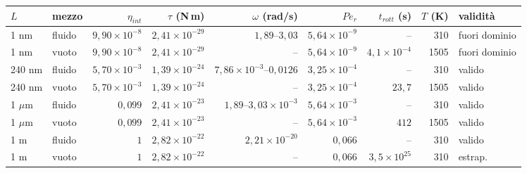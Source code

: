 \begin{tabular}{llrrrrrrl}
\hline
$L$ & mezzo & $\eta_{int}$ & $\tau$ (N\,m) & $\omega$ (rad/s) & $Pe_r$ & $t_{rott}$ (s) & $T$ (K) & validit\`a \\
\hline
1 nm & fluido & $9{,}90\times10^{-8}$ & $2{,}41\times10^{-29}$ & $1{,}89$--$3{,}03$ & $5{,}64\times10^{-9}$ & -- & 310 & fuori dominio \\
1 nm & vuoto & $9{,}90\times10^{-8}$ & $2{,}41\times10^{-29}$ & -- & $5{,}64\times10^{-9}$ & $4{,}1\times10^{-4}$ & 1505 & fuori dominio \\
240 nm & fluido & $5{,}70\times10^{-3}$ & $1{,}39\times10^{-24}$ & $7{,}86\times10^{-3}$--$0{,}0126$ & $3{,}25\times10^{-4}$ & -- & 310 & valido \\
240 nm & vuoto & $5{,}70\times10^{-3}$ & $1{,}39\times10^{-24}$ & -- & $3{,}25\times10^{-4}$ & $23{,}7$ & 1505 & valido \\
1 $\mu$m & fluido & $0{,}099$ & $2{,}41\times10^{-23}$ & $1{,}89$--$3{,}03\times10^{-3}$ & $5{,}64\times10^{-3}$ & -- & 310 & valido \\
1 $\mu$m & vuoto & $0{,}099$ & $2{,}41\times10^{-23}$ & -- & $5{,}64\times10^{-3}$ & $412$ & 1505 & valido \\
1 m & fluido & $1$ & $2{,}82\times10^{-22}$ & $2{,}21\times10^{-20}$ & $0{,}066$ & -- & 310 & valido \\
1 m & vuoto & $1$ & $2{,}82\times10^{-22}$ & -- & $0{,}066$ & $3{,}5\times10^{25}$ & 310 & estrap. \\
\hline
\end{tabular}
